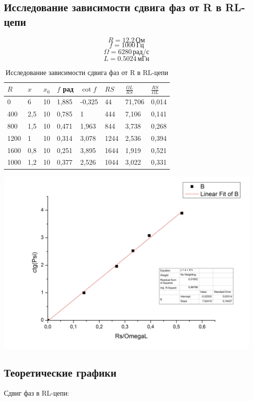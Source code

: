 \documentclass[a4paper,12pt]{article}
\begin{document}
	\subsection{Исследование зависимости сдвига фаз от R в RL-цепи}
	$$ R = 12.2\, \text{Ом}$$
	$$ f = 1000\, \text{Гц}$$
	$$ \Omega = 6280\, \text{рад/с} $$
	$$ L = 0.5024\, \text{мГн}$$
	
	\begin{table}[h]
		\centering
		\caption{Исследование зависимости сдвига фаз от R в RL-цепи}
		\label{my-label}
		\begin{tabular}{|l|l|l|l|l|l|l|l|}
			\hline
			$R$    & $x$   & $x_0$ & $f$ рад          & $\cot f$    & $RS$     & $\frac{\Omega L}{RS}$ & $\frac{RS}{\Omega L}$ \\ \hline
			0    & 6   & 10   & 1,885 & -0,325 & 44   & 71,706 & 0,014 \\ \hline
			400  & 2,5 & 10   & 0,785 & 1      & 444  & 7,106  & 0,141 \\ \hline
			800  & 1,5 & 10   & 0,471 & 1,963  & 844  & 3,738  & 0,268 \\ \hline
			1200 & 1   & 10   & 0,314 & 3,078  & 1244 & 2,536  & 0,394 \\ \hline
			1600 & 0,8 & 10   & 0,251 & 3,895  & 1644 & 1,919  & 0,521 \\ \hline
			1000 & 1,2 & 10   & 0,377 & 2,526  & 1044 & 3,022  & 0,331 \\ \hline
		\end{tabular}
		\end{table}
	
	\includegraphics[width = 0.65\linewidth]{graph4}
	
	\subsection{Теоретические графики}
	Сдвиг фаз в RL-цепи:
	
\end{document}
